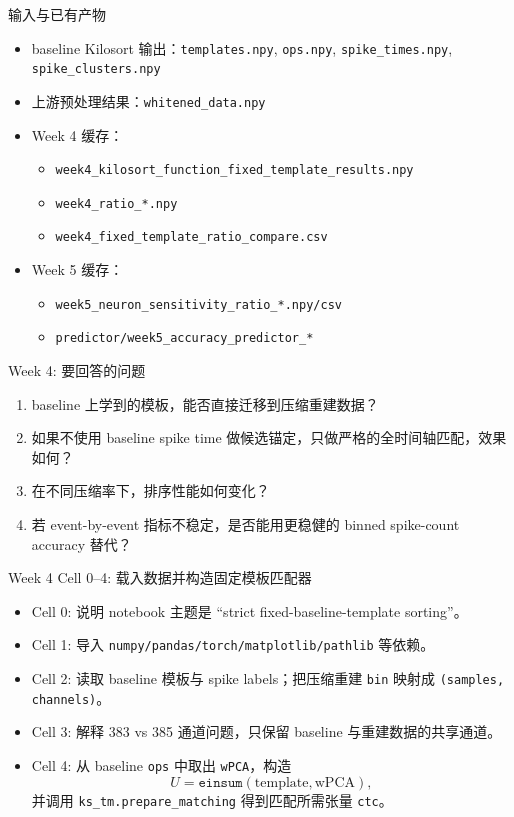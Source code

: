 \documentclass[aspectratio=169,11pt]{beamer}
\begin{document}
\begin{frame}{输入与已有产物}
  \begin{itemize}
    \item baseline Kilosort 输出：\texttt{templates.npy}, \texttt{ops.npy}, \texttt{spike\_times.npy}, \texttt{spike\_clusters.npy}
    \item 上游预处理结果：\texttt{whitened\_data.npy}
    \item Week 4 缓存：
    \begin{itemize}
      \item \texttt{week4\_kilosort\_function\_fixed\_template\_results.npy}
      \item \texttt{week4\_ratio\_*.npy}
      \item \texttt{week4\_fixed\_template\_ratio\_compare.csv}
    \end{itemize}
    \item Week 5 缓存：
    \begin{itemize}
      \item \texttt{week5\_neuron\_sensitivity\_ratio\_*.npy/csv}
      \item \texttt{predictor/week5\_accuracy\_predictor\_*}
    \end{itemize}
  \end{itemize}
\end{frame}

\begin{frame}{Week 4: 要回答的问题}
  \begin{enumerate}
    \item baseline 上学到的模板，能否直接迁移到压缩重建数据？
    \item 如果不使用 baseline spike time 做候选锚定，只做严格的全时间轴匹配，效果如何？
    \item 在不同压缩率下，排序性能如何变化？
    \item 若 event-by-event 指标不稳定，是否能用更稳健的 binned spike-count accuracy 替代？
  \end{enumerate}
\end{frame}

\begin{frame}{Week 4 Cell 0--4: 载入数据并构造固定模板匹配器}
  \begin{itemize}
    \item Cell 0: 说明 notebook 主题是 ``strict fixed-baseline-template sorting''。
    \item Cell 1: 导入 \texttt{numpy/pandas/torch/matplotlib/pathlib} 等依赖。
    \item Cell 2: 读取 baseline 模板与 spike labels；把压缩重建 \texttt{bin} 映射成 \texttt{(samples, channels)}。
    \item Cell 3: 解释 383 vs 385 通道问题，只保留 baseline 与重建数据的共享通道。
    \item Cell 4: 从 baseline \texttt{ops} 中取出 \texttt{wPCA}，构造
    \[
      U = \texttt{einsum}(\text{template}, \text{wPCA}),
    \]
    并调用 \texttt{ks\_tm.prepare\_matching} 得到匹配所需张量 \texttt{ctc}。
  \end{itemize}
\end{frame}
\end{document}
